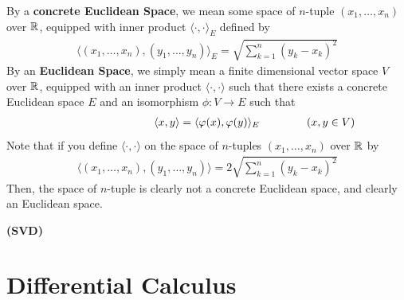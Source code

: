 \documentclass{report}
\begin{document}
\begin{mdframed}
  By a \textbf{concrete Euclidean Space}, we mean some space of $n$-tuple  $(x_1,\dots ,x_n)$ over $\mathbb{R}$, equipped with inner product  $\langle \cdot,\cdot\rangle_E$ defined by 
\begin{align*}
  \langle  (x_1,\dots,x_n)  ,(y_1,\dots ,y_n)\rangle_E= \sqrt{\sum_{k=1}^n (y_k-x_k)^2} 
\end{align*}
By an \textbf{Euclidean Space}, we simply mean a finite dimensional vector space $V$ over $\mathbb{R}$,  equipped with an inner product $\langle \cdot,\cdot\rangle $ such that there exists a concrete Euclidean space $E$ and an isomorphism  $\phi:V\to E$ such that 
\begin{align*}
\hspace{3cm}\langle x,y\rangle= \langle \phi (x),\phi (y)\rangle_E \hspace{1.5cm}(x,y \in V)
\end{align*}
Note that if you define $\langle \cdot,\cdot\rangle $ on the space of $n$-tuples $(x_1,\dots ,x_n)$ over $\mathbb{R}$ by 
\begin{align*}
  \langle  (x_1,\dots,x_n)  ,(y_1,\dots ,y_n)\rangle=2 \sqrt{\sum_{k=1}^n (y_k-x_k)^2} 
\end{align*}
Then, the space of $n$-tuple is clearly not a concrete Euclidean space, and clearly an Euclidean space. 

\end{mdframed}
\textbf{(SVD)}

\chapter{Differential Calculus}
\end{document}

